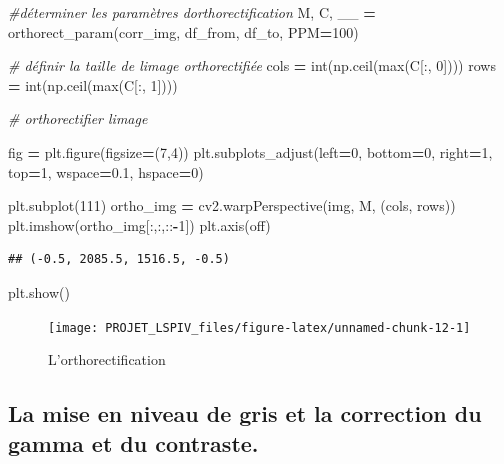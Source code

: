 \documentclass[
]{article}
\newenvironment{Shaded}{\begin{snugshade}}{\end{snugshade}}
\newcommand{\BuiltInTok}[1]{#1}
\newcommand{\CommentTok}[1]{\textcolor[rgb]{0.56,0.35,0.01}{\textit{#1}}}
\newcommand{\DecValTok}[1]{\textcolor[rgb]{0.00,0.00,0.81}{#1}}
\newcommand{\FloatTok}[1]{\textcolor[rgb]{0.00,0.00,0.81}{#1}}
\newcommand{\NormalTok}[1]{#1}
\newcommand{\OperatorTok}[1]{\textcolor[rgb]{0.81,0.36,0.00}{\textbf{#1}}}
\newcommand{\StringTok}[1]{\textcolor[rgb]{0.31,0.60,0.02}{#1}}
\begin{document}
\begin{Shaded}
\begin{Highlighting}[]
\CommentTok{\#déterminer les paramètres d\textquotesingle{}orthorectification}
\NormalTok{M, C, \_\_ }\OperatorTok{=}\NormalTok{ orthorect\_param(corr\_img, df\_from, df\_to, PPM}\OperatorTok{=}\DecValTok{100}\NormalTok{)}

\CommentTok{\# définir la taille de l\textquotesingle{}image orthorectifiée}
\NormalTok{cols }\OperatorTok{=} \BuiltInTok{int}\NormalTok{(np.ceil(}\BuiltInTok{max}\NormalTok{(C[:, }\DecValTok{0}\NormalTok{])))}
\NormalTok{rows }\OperatorTok{=} \BuiltInTok{int}\NormalTok{(np.ceil(}\BuiltInTok{max}\NormalTok{(C[:, }\DecValTok{1}\NormalTok{])))}


\CommentTok{\# orthorectifier l\textquotesingle{}image}

\NormalTok{fig }\OperatorTok{=}\NormalTok{ plt.figure(figsize}\OperatorTok{=}\NormalTok{(}\DecValTok{7}\NormalTok{,}\DecValTok{4}\NormalTok{))}
\NormalTok{plt.subplots\_adjust(left}\OperatorTok{=}\DecValTok{0}\NormalTok{, bottom}\OperatorTok{=}\DecValTok{0}\NormalTok{, right}\OperatorTok{=}\DecValTok{1}\NormalTok{, top}\OperatorTok{=}\DecValTok{1}\NormalTok{, wspace}\OperatorTok{=}\FloatTok{0.1}\NormalTok{, hspace}\OperatorTok{=}\DecValTok{0}\NormalTok{)}

\NormalTok{plt.subplot(}\DecValTok{111}\NormalTok{)}
\NormalTok{ortho\_img }\OperatorTok{=}\NormalTok{ cv2.warpPerspective(img, M, (cols, rows))}
\NormalTok{plt.imshow(ortho\_img[:,:,::}\OperatorTok{{-}}\DecValTok{1}\NormalTok{])}
\NormalTok{plt.axis(}\StringTok{\textquotesingle{}off\textquotesingle{}}\NormalTok{)}
\end{Highlighting}
\end{Shaded}

\begin{verbatim}
## (-0.5, 2085.5, 1516.5, -0.5)
\end{verbatim}

\begin{Shaded}
\begin{Highlighting}[]
\NormalTok{plt.show()}
\end{Highlighting}
\end{Shaded}

\begin{figure}[H]
\texttt{[image: PROJET\_LSPIV\_files/figure-latex/unnamed-chunk-12-1]} \caption{L'orthorectification}\label{fig:unnamed-chunk-12}
\end{figure}

\hypertarget{la-mise-en-niveau-de-gris-et-la-correction-du-gamma-et-du-contraste.}{%
\subsection*{La mise en niveau de gris et la correction du gamma et du contraste.}\label{la-mise-en-niveau-de-gris-et-la-correction-du-gamma-et-du-contraste.}}
\end{document}
